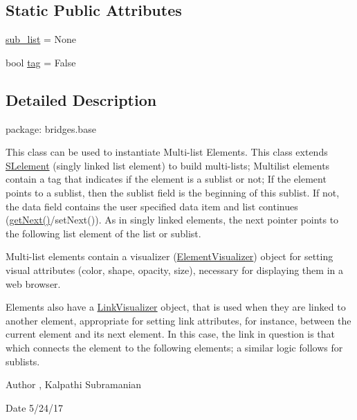 \subsection*{Static Public Attributes}
\begin{DoxyCompactItemize}
\item 
\hyperlink{class_m_lelement_1_1_m_lelement_a03b2df3aa731f864b628ff60dda11a30}{sub\+\_\+list} = None
\item 
bool \hyperlink{class_m_lelement_1_1_m_lelement_a73d6150c8466884ef6a5be9995494ad0}{tag} = False
\end{DoxyCompactItemize}


\subsection{Detailed Description}
package\+: bridges.\+base 

This class can be used to instantiate Multi-\/list Elements. This class extends \hyperlink{namespace_s_lelement}{S\+Lelement} (singly linked list element) to build multi-\/lists; Multilist elements contain a tag that indicates if the element is a sublist or not; If the element points to a sublist, then the sublist field is the beginning of this sublist. If not, the data field contains the user specified data item and list continues (\hyperlink{class_m_lelement_1_1_m_lelement_af9b63925595587439f941da816b59e49}{get\+Next()}/set\+Next()). As in singly linked elements, the next pointer points to the following list element of the list or sublist.

Multi-\/list elements contain a visualizer (\hyperlink{namespace_element_visualizer}{Element\+Visualizer}) object for setting visual attributes (color, shape, opacity, size), necessary for displaying them in a web browser.

Elements also have a \hyperlink{namespace_link_visualizer}{Link\+Visualizer} object, that is used when they are linked to another element, appropriate for setting link attributes, for instance, between the current element and its next element. In this case, the link in question is that which connects the element to the following elements; a similar logic follows for sublists.

\begin{DoxyAuthor}{Author}
, Kalpathi Subramanian
\end{DoxyAuthor}
\begin{DoxyDate}{Date}
5/24/17
\end{DoxyDate}


